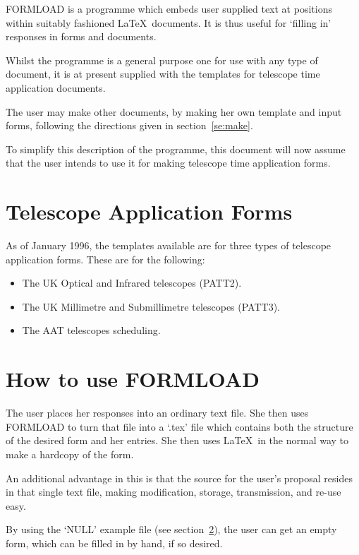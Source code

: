 FORMLOAD is a programme which embeds user supplied text at positions
within suitably fashioned \LaTeX\ documents. It is thus useful for `filling
in' responses in forms and documents.

Whilst the programme is a general purpose one for use with any type of
document, it is at present supplied with the templates for telescope time
application documents.

The user may make other documents, by making her own template and input
forms, following the directions given in section~\ref{se:make}.

To simplify this description of the programme, this document will now
assume that the user intends to use it for making telescope time
application forms.

\section{Telescope Application Forms}

As of January 1996, the templates available are for three types of telescope
application forms. These are for the following:

\begin{itemize}

\item The UK Optical and Infrared telescopes (PATT2).
\item The UK Millimetre and Submillimetre telescopes (PATT3).
\item The AAT telescopes scheduling.

\end{itemize}

\section{How to use FORMLOAD }
\label{se:use}

The user places her responses into an ordinary text file. She then uses
FORMLOAD to turn that file into a `.tex' file which contains both the
structure of the desired form and her entries. She then uses \LaTeX\ in the
normal way to make a hardcopy of the form.

An additional advantage in this is that the source for the user's proposal
resides in that single text file, making modification, storage,
transmission, and re-use easy.

By using the `NULL' example file (see section~\ref{se:use}), the user can
get an empty form, which can be filled in by hand, if so desired.

